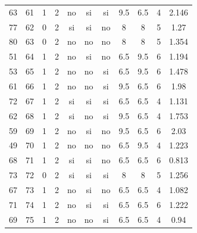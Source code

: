 \documentclass[12pt,a4paper,twoside,openright,titlepage,final]{article}
\begin{document}
\begin{appendices}
\begin{landscape}
\begin{center}
\begin{longtable}{@{\extracolsep{\fill}}*{11}{c}}
							63       & 61           & 1         & 2       & no   & si        & si           & 9.5        & 6.5           & 4             & 2.146  \\
							77       & 62           & 0         & 2       & si   & si        & no           & 8          & 8             & 5             & 1.27   \\
							80       & 63           & 0         & 2       & no   & no        & no           & 8          & 8             & 5             & 1.354  \\
							51       & 64           & 1         & 2       & no   & si        & no           & 6.5        & 9.5           & 6             & 1.194  \\
							53       & 65           & 1         & 2       & no   & no        & si           & 6.5        & 9.5           & 6             & 1.478  \\
							61       & 66           & 1         & 2       & no   & no        & si           & 9.5        & 6.5           & 6             & 1.98   \\
							72       & 67           & 1         & 2       & si   & si        & si           & 6.5        & 6.5           & 4             & 1.131  \\
							62       & 68           & 1         & 2       & si   & no        & si           & 9.5        & 6.5           & 4             & 1.753  \\
							59       & 69           & 1         & 2       & no   & si        & no           & 9.5        & 6.5           & 6             & 2.03   \\
							49       & 70           & 1         & 2       & no   & no        & no           & 6.5        & 9.5           & 4             & 1.223  \\
							68       & 71           & 1         & 2       & si   & si        & no           & 6.5        & 6.5           & 6             & 0.813  \\
							73       & 72           & 0         & 2       & si   & si        & si           & 8          & 8             & 5             & 1.256  \\
							67       & 73           & 1         & 2       & no   & si        & no           & 6.5        & 6.5           & 4             & 1.082  \\
							71       & 74           & 1         & 2       & no   & si        & si           & 6.5        & 6.5           & 6             & 1.222  \\
							69       & 75           & 1         & 2       & no   & no        & si           & 6.5        & 6.5           & 4             & 0.94   \\

\end{longtable}
\end{center}
\end{landscape}
\end{appendices}
\end{document}
